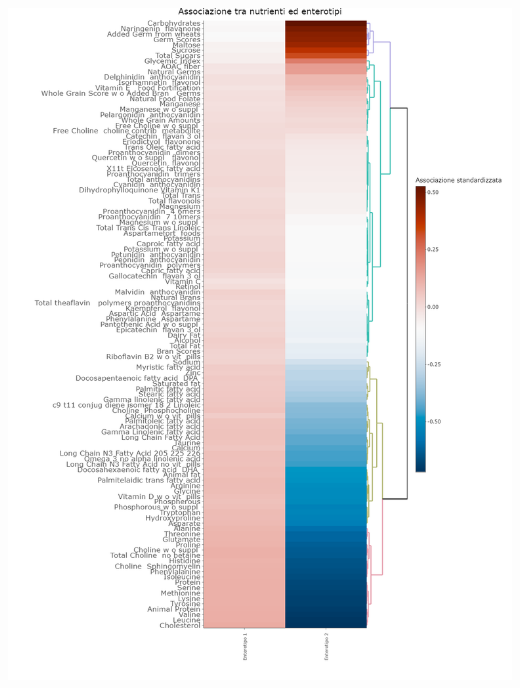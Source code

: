 \begin{Figure}
    \centering
    \includegraphics[width=\linewidth,keepaspectratio]{images/real_associazioni.png}
  \end{Figure}



